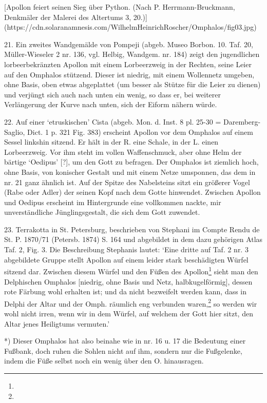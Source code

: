 \documentclass[a4paper, 11pt, oneside]{article}
\begin{document}
[Apollon feiert seinen Sieg über Python. (Nach P. Herrmann-Bruckmann, Denkmäler der Malerei des Altertums 3, 20.)](https://cdn.solaranamnesis.com/WilhelmHeinrichRoscher/Omphalos/fig03.jpg)

21. Ein zweites Wandgemälde von Pompeji (abgeb. Museo Borbon. 10. Taf. 20, Müller-Wieseler 2 nr. 136, vgl. Helbig, Wandgem. nr. 184) zeigt den jugendlichen lorbeerbekränzten Apollon mit einem Lorbeerzweig in der Rechten, seine Leier auf den Omphalos stützend. Dieser ist niedrig, mit einem Wollennetz umgeben, ohne Basis, oben etwas abgeplattet (um besser als Stütze für die Leier zu dienen) und verjüngt sich auch nach unten ein wenig, so dass er, bei weiterer Verlängerung der Kurve nach unten, sich der Eiform nähern würde.

22. Auf einer `etruskischen' Cista (abgeb. Mon. d. Inst. 8 pl. 25-30 = Daremberg-Saglio, Dict. 1 p. 321 Fig. 383) erscheint Apollon vor dem Omphalos auf einem Sessel linkshin sitzend. Er hält in der R. eine Schale, in der L. einen Lorbeerzweig. Vor ihm steht im vollen Waffenschmuck, aber ohne Helm der bärtige `Oedipus' [?], um den Gott zu befragen. Der Omphalos ist ziemlich hoch, ohne Basis, von konischer Gestalt und mit einem Netze umsponnen, das dem in nr. 21 ganz ähnlich ist. Auf der Spitze des Nabelsteins sitzt ein größerer Vogel (Rabe oder Adler) der seinen Kopf nach dem Gotte hinwendet. Zwischen Apollon und Oedipus erscheint im Hintergrunde eine vollkommen nackte, mir unverständliche Jünglingsgestalt, die sich dem Gott zuwendet.

23. Terrakotta in St. Petersburg, beschrieben von Stephani im Compte Rendu de St. P. 1870/71 (Petersb. 1874) S. 164 und abgebildet in dem dazu gehörigen Atlas Taf. 2, Fig. 3. Die Beschreibung Stephanis lautet: `Eine dritte auf Taf. 2 nr. 3 abgebildete Gruppe stellt Apollon auf einem leider stark beschädigten Würfel sitzend dar. Zwischen diesem Würfel und den Füßen des Apollon\footnote{} sieht man den Delphischen Omphalos [niedrig, ohne Basis und Netz, halbkugelförmig], dessen rote Färbung wohl erhalten ist; und da nicht bezweifelt werden kann, dass in Delphi der Altar und der Omph. räumlich eng verbunden waren,\footnote{} so werden wir wohl nicht irren, wenn wir in dem Würfel, auf welchem der Gott hier sitzt, den Altar jenes Heiligtums vermuten.'

*) Dieser Omphalos hat also beinahe wie in nr. 16 u. 17 die Bedeutung einer Fußbank, doch ruhen die Sohlen nicht auf ihm, sondern nur die Fußgelenke, indem die Füße selbst noch ein wenig über den O. hinausragen.
\end{document}
